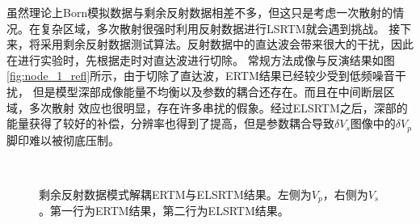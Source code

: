 虽然理论上Born模拟数据与剩余反射数据相差不多，但这只是考虑一次散射的情况。在复杂区域，多次散射很强时利用反射数据进行LSRTM就会遇到挑战。
接下来，将采用剩余反射数据测试算法。反射数据中的直达波会带来很大的干扰，因此在进行实验时，先根据走时对直达波进行切除。
常规方法成像与反演结果如图\ref{fig:node_1_refl}所示，由于切除了直达波，ERTM结果已经较少受到低频噪音干扰，
但是模型深部成像能量不均衡以及参数的耦合还存在。而且在中间断层区域，多次散射
效应也很明显，存在许多串扰的假象。经过ELSRTM之后，深部的能量获得了较好的补偿，分辨率也得到了提高，但是参数耦合导致$\delta
V_s$图像中的$\delta V_p$脚印难以被彻底压制。
\begin{figure}[!hbt]
   \centering
   \\
   \caption{剩余反射数据模式解耦ERTM与ELSRTM结果。左侧为$V_p$，右侧为$V_s$。第一行为ERTM结果，第二行为ELSRTM结果。}
   \label{fig:de_1_refl}
\end{figure}

